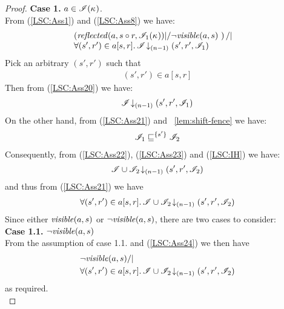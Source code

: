 \begin{lemma}
\begin{proof}
\noindent\textbf{Case 1. } $a \in \mathscr{I}(\kappa_{})$.\\
From (\ref{LSC:Ass1}) and (\ref{LSC:Ass8}) we have:
%
\begin{align}
	& \begin{array}{@{} l @{}}
		\left(\m{reflected}(a, s \composeL r, \lmod_1(\ca{})) |/ \neg\m{visible}(a, s) \ \right) /| \\
		\for{(s', r') \in a[s, r]} \extendsAMUpto{\lmod}{(n-1)}{s'}{r'}{\lmod_1}
	\end{array}
	\label{LSC:Ass20}
\end{align}
%
Pick an arbitrary $(s', r')$ such that 
%
\begin{align}
	(s', r') \in a[s, r] \label{LSC:Ass21}
\end{align}
%
Then from (\ref{LSC:Ass20}) we have:
%
\begin{align}
	\mathscr{I} \!\downarrow_{(n-1)} \left(s', r', \mathscr{I}_1\right)
	\label{LSC:Ass22}
\end{align}
%
On the other hand, from (\ref{LSC:Ass21}) and \lem~\ref{lem:shift-fence} we have:
%
\begin{align}
	\mathscr{I}_1 \sqsubseteq^{\{s'\}} \mathscr{I}_2 
	\label{LSC:Ass23}
\end{align}
%
Consequently, from (\ref{LSC:Ass22}), (\ref{LSC:Ass23}) and (\ref{LSC:IH}) we have:
%
\begin{align*}
	\mathscr{I} \cup \mathscr{I}_2 \!\downarrow_{(n-1)} \left(s', r', \mathscr{I}_2\right)
\end{align*}
%
and thus from (\ref{LSC:Ass21}) we have
%
\begin{align}
	\forall (s', r') \in a[s, r].\, \mathscr{I} \cup \mathscr{I}_2 \!\downarrow_{(n-1)} \left(s', r', \mathscr{I}_2\right)
	\label{LSC:Ass24}
\end{align}
%
Since either $\mathit{visible}(a, s)$ or $\neg\mathit{visible}(a, s)$, there are two cases to consider:\\

\noindent\textbf{Case 1.1. } $ \neg \mathit{visible}(a, s)$\\
From the assumption of case 1.1. and (\ref{LSC:Ass24}) we then have
%
\begin{align*}
	& \neg\mathit{visible}(a, s) /| \\
	&\forall (s', r') \in a[s, r].\, \mathscr{I} \cup \mathscr{I}_2 \!\downarrow_{(n-1)} \left(s', r', \mathscr{I}_2\right)
\end{align*}
%
as required.\\
%
%
%
%


\end{proof}
\end{lemma}
